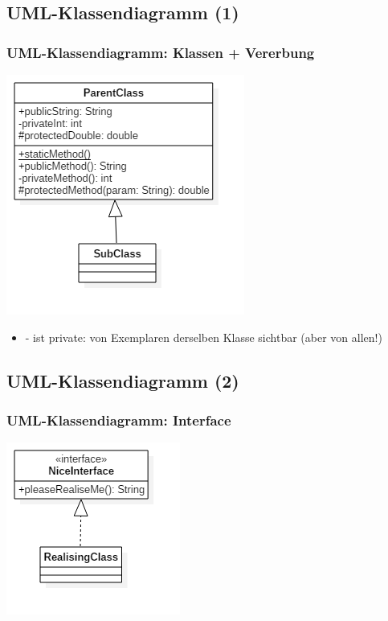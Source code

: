 \documentclass[18pt]{beamer}
\begin{document}
	\subsection{UML-Klassendiagramm (1)}
	\begin{frame}
		\frametitle{UML-Klassendiagramm: Klassen + Vererbung}
		\includegraphics[scale=0.5]{./pics/tut1/inheritence.png}
		\begin{small}
			\begin{itemize}
				\item - ist private: von Exemplaren derselben Klasse sichtbar (aber von allen!)
			\end{itemize}
		\end{small}
	\end{frame}
	
	\subsection{UML-Klassendiagramm (2)}
	\begin{frame}
		\frametitle{UML-Klassendiagramm: Interface}
		\centering
		\includegraphics[scale=0.7]{./pics/tut1/interface.png}
	\end{frame}
	
\end{document}
